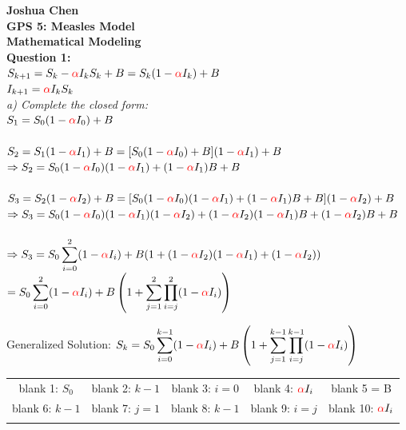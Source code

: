 \documentclass[12pt]{article}
\begin{document}
\normalsize
{\bf Joshua Chen}\\
{\bf GPS 5: Measles Model}\\
{\bf Mathematical Modeling}\\

{\bf Question 1:}\\
$S_{k+1} = S_k - \textcolor{red} {\alpha} I_k S_k + B = S_k(1 - \textcolor{red} {\alpha} I_k) + B $\\
$I_{k+1} = \textcolor{red} {\alpha} I_k S_k$\\

\textit{a) Complete the closed form:}\\
\normalsize $S_1 = S_0(1 - \textcolor{red} {\alpha} I_0) + B$\\\\
$S_2 = S_1(1 - \textcolor{red} {\alpha} I_1) + B = [S_0(1 - \textcolor{red} {\alpha} I_0) + B](1 - \textcolor{red} {\alpha} I_1) + B$\\
$\Rightarrow S_2 = S_0(1 - \textcolor{red} {\alpha} I_0)(1 - \textcolor{red} {\alpha} I_1) + (1 - \textcolor{red} {\alpha} I_1)B + B$\\\\
$S_3 = S_2(1 - \textcolor{red} {\alpha} I_2) + B =  [S_0(1 - \textcolor{red} {\alpha} I_0)(1 - \textcolor{red} {\alpha} I_1) + (1 - \textcolor{red} {\alpha} I_1)B + B](1 - \textcolor{red} {\alpha} I_2) + B$\\
$\Rightarrow S_3 = S_0(1 - \textcolor{red} {\alpha} I_0)(1 - \textcolor{red} {\alpha} I_1)(1 - \textcolor{red} {\alpha} I_2) + (1 - \textcolor{red} {\alpha} I_2)(1 - \textcolor{red} {\alpha} I_1)B +(1 - \textcolor{red} {\alpha} I_2)B + B$\\\\
$\Rightarrow S_3 = S_0 \displaystyle\sum^{2}_{i=0}(1 - \textcolor{red} {\alpha} I_i) + B(1 + (1 -\textcolor{red} {\alpha} I_2)(1 - \textcolor{red} {\alpha} I_1) + (1 - \textcolor{red} {\alpha} I_2))$\\
\hphantom{sjssfa} $= S_0\displaystyle\sum^{2}_{i=0}(1 - \textcolor{red} {\alpha} I_i) + B\left(1 + \displaystyle\sum^{2}_{j=1} \displaystyle \prod^{2}_{i=j}(1 - \textcolor{red} {\alpha} I_{i})\right)$\\
\begin{center}
Generalized Solution:
$S_k = S_0 \displaystyle\sum^{k-1}_{i=0}(1 - \textcolor{red} {\alpha} I_i) + B\left(1 + \displaystyle\sum^{k-1}_{j=1}\displaystyle \prod^{k-1}_{i=j}(1 - \textcolor{red} {\alpha} I_{i})\right)$\\
\end{center}
\begin{center}
\begin{tabular}{ c c c c c} 
blank 1:  $S_0$ & blank 2: $k-1$ & blank 3: $i = 0$ & blank 4: $\textcolor{red} {\alpha} I_i$  & blank 5 = B\\ 
blank 6: $k-1$ & blank 7: $j = 1$ & blank 8: $k - 1$ & blank 9: $i = j$ &blank 10: $\textcolor{red} {\alpha} I_{i}$ \\\\
\end{tabular}
\end{center}
\end{document}
